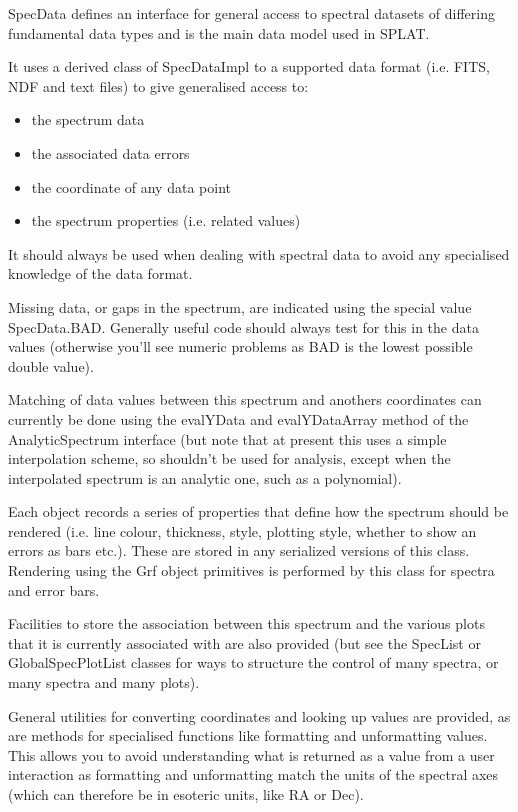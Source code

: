 \documentclass[twoside,11pt]{article}
\renewcommand{\_}{\texttt{\symbol{95}}}
\begin{document}
{SpecData defines an interface for general access to spectral
 datasets of differing fundamental data types and is the main data
 model used in SPLAT.

 It uses a derived class of SpecDataImpl to a supported data format
 (i.e. FITS, NDF and text files) to give generalised access to:
 \begin{itemize}

   \item{ the spectrum data
   }
\item{ the associated data errors
   }
\item{ the coordinate of any data point
   }
\item{ the spectrum properties (i.e. related values)
 }
\end{itemize}


 It should always be used when dealing with spectral data to avoid
 any specialised knowledge of the data format.

 Missing data, or gaps in the spectrum, are indicated using the
 special value SpecData.BAD. Generally useful code should always
 test for this in the data values (otherwise you'll see numeric
 problems as BAD is the lowest possible double value).

 Matching of data values between this spectrum and anothers
 coordinates can currently be done using the evalYData and
 evalYDataArray method of the AnalyticSpectrum interface (but note
 that at present this uses a simple interpolation scheme, so
 shouldn't be used for analysis, except when the interpolated
 spectrum is an analytic one, such as a polynomial).

 Each object records a series of properties that define how the
 spectrum should be rendered (i.e. line colour, thickness, style,
 plotting style, whether to show an errors as bars etc.). These are
 stored in any serialized versions of this class. Rendering using
 the Grf object primitives is performed by this class for spectra
 and error bars.

 Facilities to store the association between this spectrum and the
 various plots that it is currently associated with are also provided
 (but see the SpecList or GlobalSpecPlotList classes for ways to
 structure the control of many spectra, or many spectra and many
 plots).

 General utilities for converting coordinates and looking up values
 are provided, as are methods for specialised functions like
 formatting and unformatting values. This allows you to avoid
 understanding what is returned as a value from a user
 interaction as formatting and unformatting match the units of the
 spectral axes (which can therefore be in esoteric units, like RA
 or Dec).}
\end{document}

